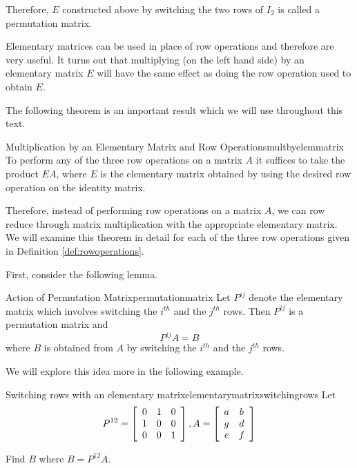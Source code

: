 Therefore, $E$ constructed above by switching the two rows of $I_2$ is called a permutation matrix. 

Elementary matrices can be used in place of row operations and therefore are very useful. It turns
out that multiplying (on the left hand side) by an elementary matrix $E$ will have the
same effect as doing the row operation used to obtain $E$.

The following theorem is an important result which we will use throughout this text. 

\begin{theorem}{Multiplication by an Elementary Matrix and Row Operations}{multbyelemmatrix}
To perform any of the three row operations on a matrix $A$
it suffices to take the product $EA$, where $E$ is the elementary matrix obtained by 
using the desired row operation on the identity matrix.
\end{theorem}

Therefore, instead of performing row operations on a matrix $A$, we
can row reduce through matrix multiplication with the appropriate
elementary matrix. We will examine this theorem in detail for each of
the three row operations given in Definition \ref{def:rowoperations}.

First, consider the following lemma.

\begin{lemma}{Action of Permutation Matrix}{permutationmatrix}
Let $P^{ij}$ denote the elementary matrix which involves
switching the $i^{th}$ and the $j^{th}$ rows. Then $P^{ij}$ is a permutation matrix and 
\begin{equation*}
P^{ij}A=B
\end{equation*}
where $B$ is obtained from $A$ by switching the $i^{th}$ and the $j^{th}$
rows.
\end{lemma}

We will explore this idea more in the following example.

\begin{example}{Switching rows with an elementary matrix}{elementarymatrixswitchingrows}
Let
\begin{equation*}
P^{12} = \left[
\begin{array}{rrr}
0 & 1 & 0 \\
1 & 0 & 0 \\
0 & 0 & 1
\end{array}
\right], A = \left[
\begin{array}{cc}
a & b \\
g & d \\
e & f
\end{array}
\right] 
\end{equation*}

Find $B$ where $B = P^{12}A$.
\end{example}

